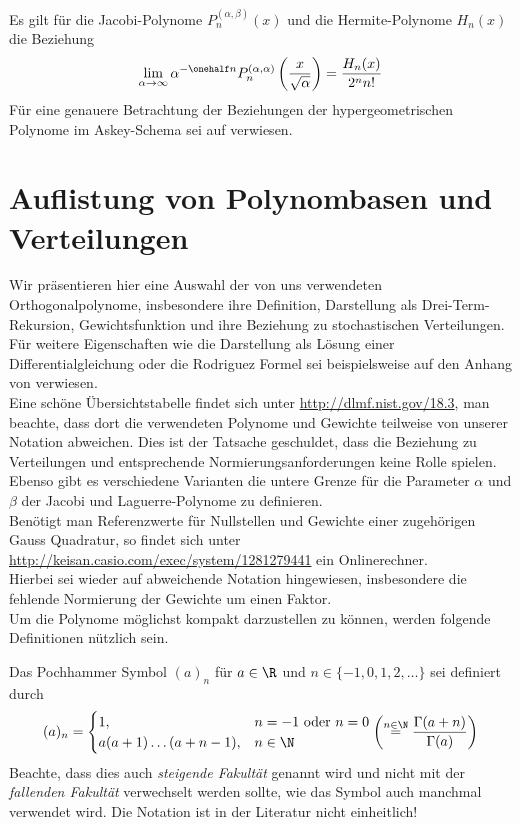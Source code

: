 \begin{mathbsp}
Es gilt für die Jacobi-Polynome $P_n^{(\alpha,\beta)}(x)$ und die Hermite-Polynome $H_n(x)$ die Beziehung
\[\lim\limits_{\alpha\to\infty}\alpha^{-\onehalf n}P_n^{(\alpha,\alpha)}\left(\frac{x}{\sqrt{\alpha}}\right)=\frac{H_n(x)}{2^nn!}\]
Für eine genauere Betrachtung der Beziehungen der hypergeometrischen Polynome im Askey-Schema sei auf \autocite{koekoekswart98} verwiesen.
\end{mathbsp}

\section{Auflistung von Polynombasen und Verteilungen}
Wir präsentieren hier eine Auswahl der von uns verwendeten Orthogonalpolynome, insbesondere ihre Definition, Darstellung als Drei-Term-Rekursion, Gewichtsfunktion und ihre Beziehung zu stochastischen Verteilungen. Für weitere Eigenschaften wie die Darstellung als Lösung einer Differentialgleichung oder die Rodriguez Formel sei beispielsweise auf den Anhang von \autocite{dongbinxiu2010} verwiesen.\\
Eine schöne Übersichtstabelle findet sich unter \url{http://dlmf.nist.gov/18.3}, man beachte, dass dort die verwendeten Polynome und Gewichte teilweise von unserer Notation abweichen. Dies ist der Tatsache geschuldet, dass die Beziehung zu Verteilungen und entsprechende Normierungsanforderungen keine Rolle spielen. Ebenso gibt es verschiedene Varianten die untere Grenze für die Parameter $\alpha$ und $\beta$ der Jacobi und Laguerre-Polynome zu definieren.\\
Benötigt man Referenzwerte für Nullstellen und Gewichte einer zugehörigen Gauss Quadratur, so findet sich unter\\\url{http://keisan.casio.com/exec/system/1281279441} ein Onlinerechner.\\
Hierbei sei wieder auf abweichende Notation hingewiesen, insbesondere die fehlende Normierung der Gewichte um einen Faktor.\\
Um die Polynome möglichst kompakt darzustellen zu können, werden folgende Definitionen nützlich sein.
\begin{mathdef}
Das Pochhammer Symbol $(a)_n$ für $a\in\R$ und $n\in\lbrace -1,0,1,2,\dots\rbrace$ sei definiert durch
\[(a)_n=
   \begin{cases}
   1, &n=-1\text{ oder } n=0\\
   a(a+1)\dots (a+n-1), &n\in\N
   \end{cases}\left(\stackrel{n\in\N}{=}\frac{\Gamma(a+n)}{\Gamma(a)}\right)
   \]
Beachte, dass dies auch \emph{steigende Fakultät} genannt wird und nicht mit der \emph{fallenden Fakultät} verwechselt werden sollte, wie das Symbol auch manchmal verwendet wird. Die Notation ist in der Literatur nicht einheitlich!
\end{mathdef}

